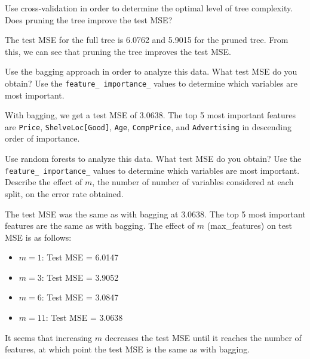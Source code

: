 \documentclass{article}
\begin{document}
\begin{probset}
\begin{prob}
\begin{subprobset}
        \begin{subprob}
            Use cross-validation in order to determine the optimal level of tree complexity. Does pruning the tree improve the test MSE?

            \begin{soln}
                The test MSE for the full tree is 6.0762 and 5.9015 for the pruned tree. From this, we can see that pruning the tree improves the test MSE.
            \end{soln}
        \end{subprob}

        \newpage

        \begin{subprob}
            Use the bagging approach in order to analyze this data. What test MSE do you obtain? Use the \texttt{feature\_ importance\_} values to determine which variables are most important.

            \begin{soln}
                With bagging, we get a test MSE of 3.0638. The top 5 most important features are \texttt{Price}, \texttt{ShelveLoc[Good]}, \texttt{Age}, \texttt{CompPrice}, and \texttt{Advertising} in descending order of importance.
            \end{soln}
        \end{subprob}

        \begin{subprob}
            Use random forests to analyze this data. What test MSE do you obtain? Use the \newline \texttt{feature\_ importance\_} values to determine which variables are most important. Describe the effect of $m$, the number of number of variables considered at each split, on the error rate obtained.

            \begin{soln}
                The test MSE was the same as with bagging at 3.0638. The top 5 most important features are the same as with bagging. The effect of $m$ (max\_features) on test MSE is as follows:
                \begin{itemize}
                    \item $m=1$: Test MSE = 6.0147
                    \item $m=3$: Test MSE = 3.9052
                    \item $m=6$: Test MSE = 3.0847
                    \item $m=11$: Test MSE = 3.0638
                \end{itemize}
                It seems that increasing $m$ decreases the test MSE until it reaches the number of features, at which point the test MSE is the same as with bagging.
            \end{soln}
        \end{subprob}
    \end{subprobset}
\end{prob}


\end{probset}
\end{document}
